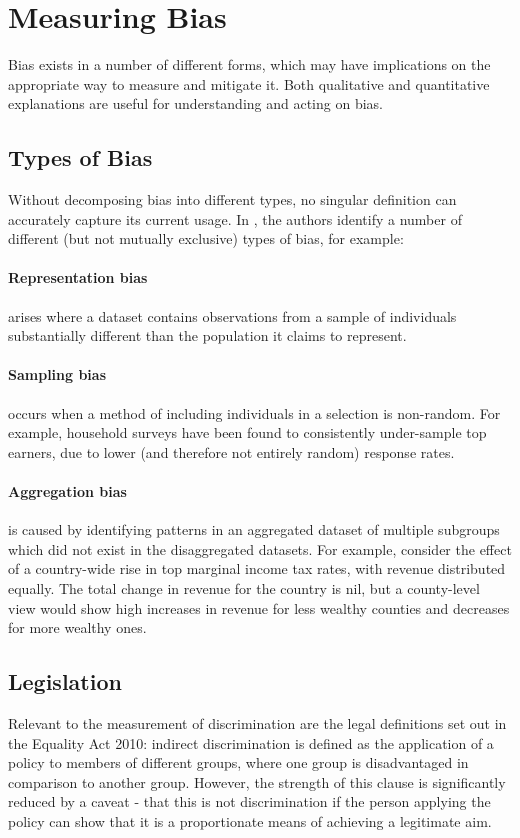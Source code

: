 \documentclass[conference]{IEEEtran}
\begin{document}
\section{Measuring Bias}
\label{sec:measurement}
Bias exists in a number of different forms, which may have implications on the appropriate way to measure and mitigate it. Both qualitative and quantitative explanations are useful for understanding and acting on bias.
\subsection{Types of Bias}
Without decomposing bias into different types, no singular definition can accurately capture its current usage. In \cite{DBLP:journals/corr/abs-1908-09635}, the authors identify a number of different (but not mutually exclusive) types of bias, for example:
\paragraph{Representation bias} arises where a dataset contains observations from a sample of individuals substantially different than the population it claims to represent.
\paragraph{Sampling bias} occurs when a method of including individuals in a selection is non-random. For example, household surveys have been found to consistently under-sample top earners, due to lower (and therefore not entirely random) response rates\cite{Bach2019}.
\paragraph{Aggregation bias} is caused by identifying patterns in an aggregated dataset of multiple subgroups which did not exist in the disaggregated datasets.  For example, consider the effect of a country-wide rise in top marginal income tax rates, with revenue distributed equally. The total change in revenue for the country is nil, but a county-level view would show high increases in revenue for less wealthy counties and decreases for more wealthy ones.
\subsection{Legislation}
Relevant to the measurement of discrimination are the legal definitions  set out in the Equality Act 2010: indirect discrimination is defined as the application of a policy to members of different groups, where one group is disadvantaged in comparison to another group. However, the strength of this clause is significantly reduced by a caveat - that this is not discrimination if the person applying the policy can show that it is a proportionate means of achieving a legitimate aim\cite{equality_act}.
\end{document}
